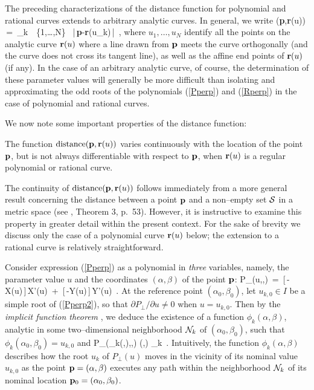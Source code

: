 The preceding characterizations of the distance function for
polynomial and rational curves extends to arbitrary analytic
curves. In general, we write
\be \label{distance3}
\dist({\bf p},{\bf r}(u)) \,=\,
\min_{k \,\in\, \{1,\ldots,N\}} \, |\,{\bf p}-{\bf r}(u_k)\,| \,,
\ee
where $u_1,\ldots,u_N$ identify all the points on the analytic
curve ${\bf r}(u)$ where a line drawn from ${\bf p}$ meets the
curve orthogonally (and the curve does not cross its tangent line),
as well as the affine end points of ${\bf r}(u)$ (if any). In the
case of an arbitrary analytic curve, of course, the determination
of these parameter values will generally be more difficult than
isolating and approximating the odd roots of the polynomials
(\ref{Pperp}) and (\ref{Rperp}) in the case of polynomial
and rational curves.

We now note some important properties of the distance function:

\begin{propn}
The function ${\rm distance}({\bf p},{\bf r}(u))$ varies continuously with
the location of the point ${\bf p}$, but is not always differentiable
with respect to ${\bf p}$, when ${\bf r}(u)$ is a regular polynomial
or rational curve.
\end{propn}

\prf The continuity of ${\rm distance}({\bf p},{\bf r}(u))$ follows immediately
from a more general result concerning the distance between a point
${\bf p}$ and a non--empty set ${\cal S}$ in a metric space (see \cite
{kelly79}, Theorem 3, p.~53). However, it is instructive to examine
this property in greater detail within the present context. For the
sake of brevity we discuss only the case of a polynomial curve
${\bf r}(u)$ below; the extension to a rational curve is relatively
straightforward.

Consider expression (\ref{Pperp}) as a polynomial in {\it three\/}
variables, namely, the parameter value $u$ and the coordinates
$(\alpha,\beta)$ of
the point ${\bf p}$:
\be \label{Pperp2}
P_\perp(u,\alpha,\beta) \,=\,
[\,\alpha-X(u)\,]\,X'(u) \,+\, [\,\beta-Y(u)\,]\,Y'(u) \,.
\ee
At the reference point $(\alpha_0,\beta_0)$, let $u_{k,0} \in I$ be a
simple root of (\ref{Pperp2}), so that $\partial P_\perp/\partial u
\not=0$ when $u=u_{k,0}$. Then by the {\it implicit function theorem\/}
\cite{buck78}, we deduce the existence of a function $\phi_k(\alpha,
\beta)$, analytic in some two--dimensional neighborhood ${\cal N}_k$
of $(\alpha_0,\beta_0)$, such that $\phi_k(\alpha_0,\beta_0)=u_{k,0}$
and
\be
P_\perp(\phi_k(\alpha,\beta),\alpha,\beta) 
 (\alpha,\beta) _k \,.
\ee
Intuitively, the function $\phi_k(\alpha,\beta)$ describes how the
root $u_k$ of $P_\perp(u)$ moves in the vicinity of its nominal
value $u_{k,0}$ as the point ${\bf p}=(\alpha,\beta)$ executes any
path within the neighborhood ${\cal N}_k$ of its nominal location
${\bf p}_0=(\alpha_0,\beta_0)$.


